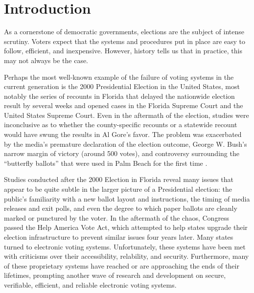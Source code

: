\chapter{Introduction} \label{intro}

As a cornerstone of democratic governments, elections are the subject of intense scrutiny. Voters expect that the systems and procedures put in place are easy to follow, efficient, and inexpensive. However, history tells us that in practice, this may not always be the case.

Perhaps the most well-known example of the failure of voting systems in the current generation is the 2000 Presidential Election in the United States, most notably the series of recounts in Florida that delayed the nationwide election result by several weeks and opened cases in the Florida Supreme Court and the United States Supreme Court. Even in the aftermath of the election, studies were inconclusive as to whether the county-specific recounts or a statewide recount would have swung the results in Al Gore's favor. The problem was exacerbated by the media's premature declaration of the election outcome, George W. Bush's narrow margin of victory (around 500 votes), and controversy surrounding the ``butterfly ballots'' that were used in Palm Beach for the first time \cite{wiki:2000-fl-pres}.

Studies conducted after the 2000 Election in Florida reveal many issues that appear to be quite subtle in the larger picture of a Presidential election: the public's familiarity with a new ballot layout and instructions, the timing of media releases and exit polls, and even the degree to which paper ballots are cleanly marked or punctured by the voter. In the aftermath of the chaos, Congress passed the Help America Vote Act, which attempted to help states upgrade their election infrastructure to prevent similar issues four years later. Many states turned to electronic voting systems. Unfortunately, these systems have been met with criticisms over their accessibility, relability, and security. Furthermore, many of these proprietary systems have reached or are approaching the ends of their lifetimes, prompting another wave of research and development on secure, verifiable, efficient, and reliable electronic voting systems.

